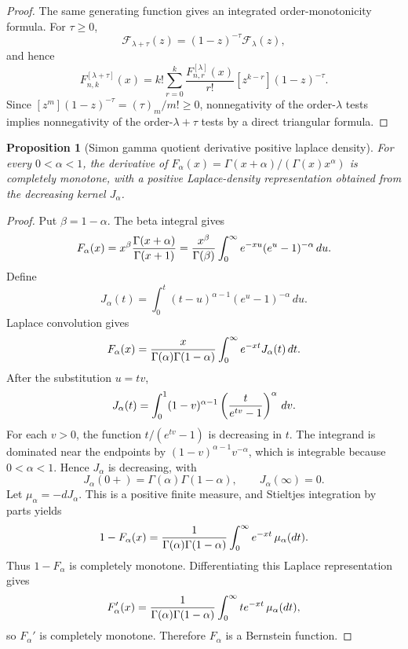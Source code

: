 \documentclass[11pt]{article}
\numberwithin{equation}{section}
\newtheorem{proposition}[theorem]{Proposition}
\theoremstyle{definition}
\theoremstyle{remark}
\newcommand{\1}{\mathbf 1}
\begin{document}
\begin{proof}
The same generating function gives an integrated order-monotonicity formula. For \(\tau\ge0\),
\[
\mathcal F_{\lambda+\tau}(z)
=
(1-z)^{-\tau}\mathcal F_\lambda(z),
\]
and hence
\[
F^{[\lambda+\tau]}_{n,k}(x)
=
k!\sum_{r=0}^{k}
\frac{F^{[\lambda]}_{n,r}(x)}{r!}
[z^{k-r}](1-z)^{-\tau}.
\]
Since \([z^m](1-z)^{-\tau}=(\tau)_m/m!\ge0\), nonnegativity of the order-\(\lambda\) tests implies nonnegativity of the order-\(\lambda+\tau\) tests by a direct triangular formula.
\end{proof}

\begin{proposition}[Simon gamma quotient derivative positive laplace density]
\label{res:simon-gamma-quotient-derivative-positive-laplace-density}
For every \(0<\alpha<1\), the derivative of \(F_\alpha(x)=\Gamma(x+\alpha)/(\Gamma(x)x^\alpha)\) is completely monotone, with a positive Laplace-density representation obtained from the decreasing kernel \(J_\alpha\).
\end{proposition}

\begin{proof}
Put \(\beta=1-\alpha\).  The beta integral gives
\[
 F_\alpha(x)
 =x^\beta{\Gamma(x+\alpha)\over\Gamma(x+1)}
 ={x^\beta\over\Gamma(\beta)}
   \int_0^\infty e^{-xu}(e^u-1)^{-\alpha}\,du .
\]
Define
\[
 J_\alpha(t)=\int_0^t (t-u)^{\alpha-1}(e^u-1)^{-\alpha}\,du .
\]
Laplace convolution gives
\[
 F_\alpha(x)
 ={x\over\Gamma(\alpha)\Gamma(1-\alpha)}
   \int_0^\infty e^{-xt}J_\alpha(t)\,dt .
\]
After the substitution \(u=tv\),
\[
J_\alpha(t)=
\int_0^1(1-v)^{\alpha-1}
\left({t\over e^{tv}-1}\right)^\alpha\,dv .
\]
For each \(v>0\), the function \(t/(e^{tv}-1)\) is decreasing in \(t\).
The integrand is dominated near the endpoints by
\((1-v)^{\alpha-1}v^{-\alpha}\), which is integrable because
\(0<\alpha<1\).  Hence \(J_\alpha\) is decreasing, with
\[
 J_\alpha(0+)=\Gamma(\alpha)\Gamma(1-\alpha),
 \qquad
 J_\alpha(\infty)=0 .
\]
Let \(\mu_\alpha=-dJ_\alpha\).  This is a positive finite measure, and
Stieltjes integration by parts yields
\[
 1-F_\alpha(x)
 ={1\over\Gamma(\alpha)\Gamma(1-\alpha)}
  \int_0^\infty e^{-xt}\,\mu_\alpha(dt).
\]
Thus \(1-F_\alpha\) is completely monotone.  Differentiating this Laplace
representation gives
\[
 F_\alpha'(x)
 ={1\over\Gamma(\alpha)\Gamma(1-\alpha)}
  \int_0^\infty t e^{-xt}\,\mu_\alpha(dt),
\]
so \(F_\alpha'\) is completely monotone.  Therefore \(F_\alpha\) is a
Bernstein function.
\end{proof}
\end{document}

